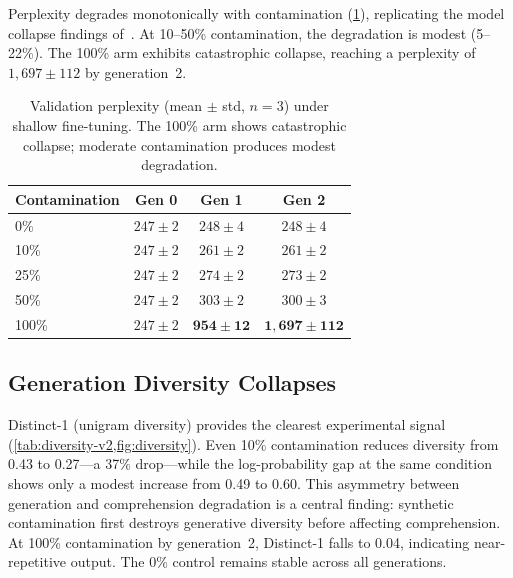 \documentclass{article}
\begin{document}
Perplexity degrades monotonically with contamination (\cref{tab:ppl-v2}), replicating the model collapse findings of~\citet{shumailov2024curse}.
At 10--50\% contamination, the degradation is modest (5--22\%).
The 100\% arm exhibits catastrophic collapse, reaching a perplexity of $1{,}697 \pm 112$ by generation~2.

\begin{table}[htbp]
\centering
\caption{Validation perplexity (mean $\pm$ std, $n{=}3$) under shallow fine-tuning. The 100\% arm shows catastrophic collapse; moderate contamination produces modest degradation.}
\label{tab:ppl-v2}
\begin{tabular}{lccc}
\toprule
Contamination & Gen 0 & Gen 1 & Gen 2 \\
\midrule
0\%   & $247 \pm 2$ & $248 \pm 4$ & $248 \pm 4$ \\
10\%  & $247 \pm 2$ & $261 \pm 2$ & $261 \pm 2$ \\
25\%  & $247 \pm 2$ & $274 \pm 2$ & $273 \pm 2$ \\
50\%  & $247 \pm 2$ & $303 \pm 2$ & $300 \pm 3$ \\
100\% & $247 \pm 2$ & $\mathbf{954 \pm 12}$ & $\mathbf{1{,}697 \pm 112}$ \\
\bottomrule
\end{tabular}
\end{table}

\subsection{Generation Diversity Collapses}

Distinct-1 (unigram diversity) provides the clearest experimental signal (\cref{tab:diversity-v2,fig:diversity}).
Even 10\% contamination reduces diversity from 0.43 to 0.27---a 37\% drop---while the log-probability gap at the same condition shows only a modest increase from 0.49 to 0.60.
This asymmetry between generation and comprehension degradation is a central finding: synthetic contamination first destroys generative diversity before affecting comprehension.
At 100\% contamination by generation~2, Distinct-1 falls to 0.04, indicating near-repetitive output.
The 0\% control remains stable across all generations.
\end{document}
